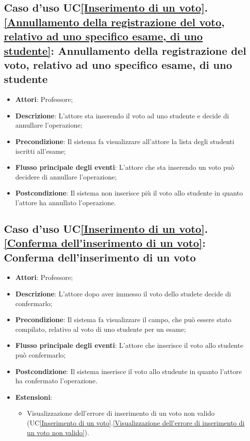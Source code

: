\subsection{Caso d'uso UC\ref{Inserimento di un voto}.\ref{Annullamento della registrazione del voto, relativo ad uno specifico esame, di uno studente}: Annullamento della registrazione del voto, relativo ad uno specifico esame, di uno studente}
\begin{itemize}
	\item \textbf{Attori}: Professore;
	\item \textbf{Descrizione}: L'attore sta inserendo il voto ad uno studente e decide di annullare l'operazione;
	\item \textbf{Precondizione}: Il sistema fa visualizzare all'attore la lista degli studenti iscritti all'esame;
	
	\item \textbf{Flusso principale degli eventi}: L'attore che sta inserendo un voto può decidere di annullare l'operazione;
	\item \textbf{Postcondizione}: Il sistema non inserisce più il voto allo studente in quanto l'attore ha annullato l'operazione.
	
\end{itemize}

\subsection{Caso d'uso UC\ref{Inserimento di un voto}.\ref{Conferma dell'inserimento di un voto}: Conferma dell'inserimento di un voto}
\begin{itemize}
	\item \textbf{Attori}: Professore;
	\item \textbf{Descrizione}: L'attore dopo aver immesso il voto dello studete decide di confermarlo;
	\item \textbf{Precondizione}: Il sistema fa visualizzare il campo, che può essere stato compilato, relativo al voto di uno studente per un esame;
	\item \textbf{Flusso principale degli eventi}: L'attore che inserisce il voto allo studente può confermarlo;
	\item \textbf{Postcondizione}: Il sistema inserisce il voto allo studente in quanto l'attore ha confermato l'operazione.
	\item \textbf{Estensioni}:
	\begin{itemize}
		\item Visualizzazione dell'errore di inserimento di un voto non valido (UC\ref{Inserimento di un voto}.\ref{Visualizzazione dell'errore di inserimento di un voto non valido}).
	\end{itemize}
\end{itemize}


